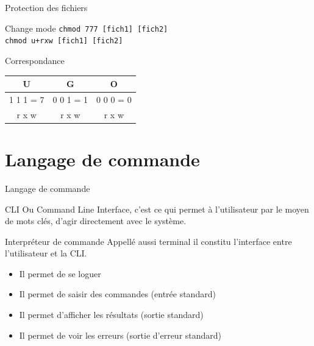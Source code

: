 \begin{frame}{Protection des fichiers}
\begin{block}{Change mode}
\texttt{chmod 777 [fich1] [fich2]}\\
\texttt{chmod u+rxw [fich1] [fich2]}
\end{block}

\begin{block}{Correspondance}
\begin{center}
\begin{tabular}{|c|c|c|}
\hline
U & G & O\\
\hline
1 1 1 = 7 & 0 0 1 = 1 & 0 0 0 = 0 \\
\hline
r x w & r x w & r x w \\
\hline
\end{tabular}
\end{center}
\end{block}

\end{frame}

\section{Langage de commande}

\begin{frame}{Langage de commande}
\begin{alertblock}{CLI}
Ou Command Line Interface, c'est ce qui permet à l'utilisateur par le moyen de mots clés, d'agir directement avec le système.
\end{alertblock}

\begin{block}{Interpréteur de commande}
Appellé aussi terminal il constitu l'interface entre l'utilisateur et la CLI.
\begin{itemize}
\item Il permet de se loguer
\item Il permet de saisir des commandes (entrée standard)
\item Il permet d'afficher les résultats (sortie standard)
\item Il permet de voir les erreurs (sortie d'erreur standard)
\end{itemize}
\end{block}
\end{frame}

